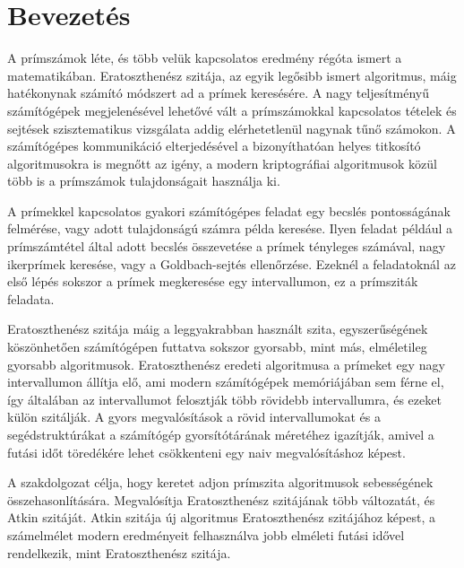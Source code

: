 \documentclass[12pt]{report}
\begin{document}
\tableofcontents

\chapter{Bevezetés}

A prímszámok léte, és több velük kapcsolatos eredmény régóta ismert a matematikában.
Eratoszthenész szitája, az egyik legősibb ismert algoritmus, máig hatékonynak számító módszert ad a prímek keresésére.
A nagy teljesítményű számítógépek megjelenésével lehetővé vált a prímszámokkal kapcsolatos tételek és sejtések szisztematikus vizsgálata addig elérhetetlenül nagynak tűnő számokon.
A számítógépes kommunikáció elterjedésével a bizonyíthatóan helyes titkosító algoritmusokra is megnőtt az igény, a modern kriptográfiai algoritmusok közül több is a prímszámok tulajdonságait használja ki.

A prímekkel kapcsolatos gyakori számítógépes feladat egy becslés pontosságának felmérése, vagy adott tulajdonságú számra példa keresése.
Ilyen feladat például a prímszámtétel által adott becslés összevetése a prímek tényleges számával, nagy ikerprímek keresése\cite{twinprimes}, vagy a Goldbach-sejtés ellenőrzése\cite{gaps}.
Ezeknél a feladatoknál az első lépés sokszor a prímek megkeresése egy intervallumon, ez a prímsziták feladata.

Eratoszthenész szitája máig a leggyakrabban használt szita, egyszerűségének köszönhetően számítógépen futtatva sokszor gyorsabb, mint más, elméletileg gyorsabb algoritmusok.
Eratoszthenész eredeti algoritmusa a prímeket egy nagy intervallumon állítja elő, ami modern számítógépek memóriájában sem férne el, így általában az intervallumot felosztják több rövidebb intervallumra, és ezeket külön szitálják.
A gyors megvalósítások a rövid intervallumokat és a segédstruktúrákat a számítógép gyorsítótárának méretéhez igazítják, amivel a futási időt töredékére lehet csökkenteni egy naiv megvalósításhoz képest.

A szakdolgozat célja, hogy keretet adjon prímszita algoritmusok sebességének összehasonlítására.
Megvalósítja Eratoszthenész szitájának több változatát, és Atkin szitáját\cite{atkin}.
Atkin szitája új algoritmus Eratoszthenész szitájához képest, a számelmélet modern eredményeit felhasználva jobb elméleti futási idővel rendelkezik, mint Eratoszthenész szitája.






\end{document}
